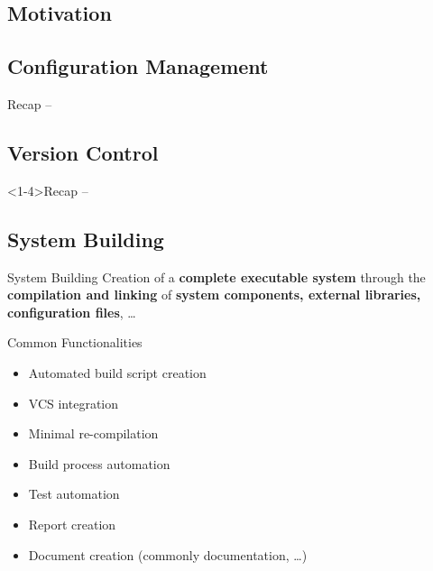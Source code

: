 
\subsection{Motivation}


\subsection{Configuration Management}
\begin{frame}{Recap -- \insertsubsection \mytitlesource{\sommerville}}
	\slideConfigManagement
\end{frame}

\subsection{Version Control}
\begin{frame}<1-4>{Recap -- \insertsubsection  \mytitlesource{\sommerville}}
	\slideVersionControl
\end{frame}

\subsection{System Building}
\begin{frame}{\insertsubsection  \mytitlesource{\sommerville}}
	\begin{fancycolumns}[animation=none]
		\begin{definition}{System Building}
			Creation of a \textbf{complete executable system} through the \textbf{compilation and linking} of \textbf{system components, external libraries, configuration files}, \dots
		\end{definition}\pause
		
		\begin{note}{Common Functionalities}
			\begin{itemize}
				\item Automated build script creation
				\item VCS integration
				\item Minimal re-compilation
				\item Build process automation
				\item Test automation
				\item Report creation
				\item Document creation (commonly documentation, \dots)
			\end{itemize}
		\end{note} \pause
		\nextcolumn
		\centering{}%
	\end{fancycolumns}
\end{frame}

